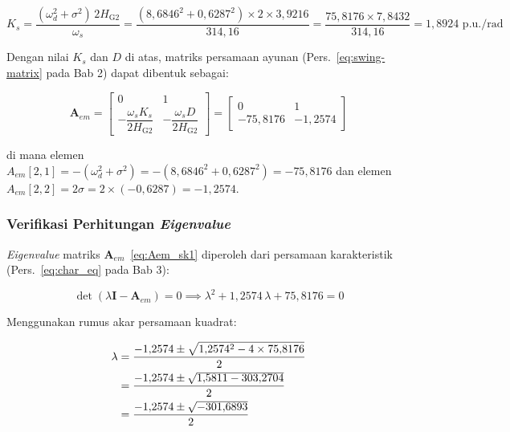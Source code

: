 \begin{equation}
    K_s = \frac{(\omega_d^2 + \sigma^2)\,2H_{\text{G2}}}{\omega_s}
        = \frac{(8{,}6846^2 + 0{,}6287^2) \times 2 \times 3{,}9216}{314{,}16}
        = \frac{75{,}8176 \times 7{,}8432}{314{,}16}
        = 1{,}8924 \text{ p.u./rad}
    \label{eq:Ks_calc}
\end{equation}

Dengan nilai $K_s$ dan $D$ di atas, matriks persamaan ayunan (Pers.~\ref{eq:swing-matrix}
pada Bab 2) dapat dibentuk sebagai:

\begin{equation}
    \mathbf{A}_{em} =
    \begin{bmatrix}
        0 & 1 \\[6pt]
        -\dfrac{\omega_s K_s}{2H_{\text{G2}}} & -\dfrac{\omega_s D}{2H_{\text{G2}}}
    \end{bmatrix}
    =
    \begin{bmatrix}
        0 & 1 \\[6pt]
        -75{,}8176 & -1{,}2574
    \end{bmatrix}
    \label{eq:Aem_sk1}
\end{equation}

di mana elemen $A_{em}[2,1] = -(\omega_d^2 + \sigma^2) = -(8{,}6846^2 + 0{,}6287^2)
= -75{,}8176$ dan elemen $A_{em}[2,2] = 2\sigma = 2 \times (-0{,}6287) = -1{,}2574$.

\subsubsection{Verifikasi Perhitungan \textit{Eigenvalue}}

\textit{Eigenvalue} matriks $\mathbf{A}_{em}$~\eqref{eq:Aem_sk1} diperoleh dari
persamaan karakteristik (Pers.~\ref{eq:char_eq} pada Bab 3):

\begin{equation}
    \det(\lambda\mathbf{I} - \mathbf{A}_{em}) = 0 \implies
    \lambda^2 + 1{,}2574\,\lambda + 75{,}8176 = 0
    \label{eq:char_sk1}
\end{equation}

Menggunakan rumus akar persamaan kuadrat:

\begin{align}
    \lambda &= \frac{-1{,}2574 \pm \sqrt{1{,}2574^2 - 4 \times 75{,}8176}}{2} \notag \\
            &= \frac{-1{,}2574 \pm \sqrt{1{,}5811 - 303{,}2704}}{2} \notag \\
            &= \frac{-1{,}2574 \pm \sqrt{-301{,}6893}}{2}
    \label{eq:lambda_calc}
\end{align}

